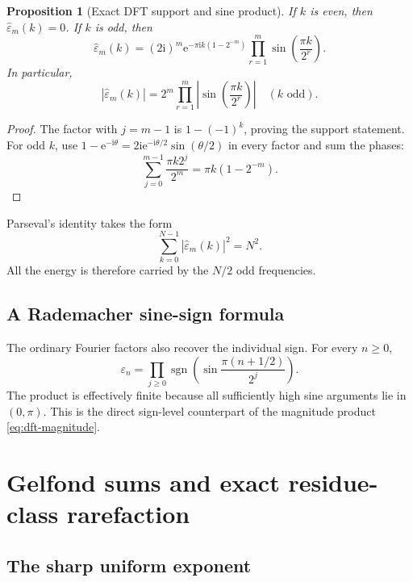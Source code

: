 \documentclass[11pt,oneside]{article}
\newtheorem{proposition}[theorem]{Proposition}
\theoremstyle{definition}
\theoremstyle{remark}
\newcommand{\e}{\mathrm e}
\newcommand{\ii}{\mathrm i}
\newcommand{\sgn}{\operatorname{sgn}}
\newcommand{\eps}{\varepsilon}
\begin{document}
\begin{proposition}[Exact DFT support and sine product]\label{prop:dft-sine}
If $k$ is even, then $\widehat\eps_m(k)=0$.  If $k$ is odd, then
\begin{equation}\label{eq:dft-sine}
 \widehat\eps_m(k)
 =(2\ii)^m\e^{-\pi\ii k(1-2^{-m})}
 \prod_{r=1}^{m}\sin\!\left(\frac{\pi k}{2^r}\right).
\end{equation}
In particular,
\begin{equation}\label{eq:dft-magnitude}
 |\widehat\eps_m(k)|
 =2^m\prod_{r=1}^{m}
   \left|\sin\!\left(\frac{\pi k}{2^r}\right)\right|
 \quad(k\text{ odd}).
\end{equation}
\end{proposition}

\begin{proof}
The factor with $j=m-1$ is $1-(-1)^k$, proving the support statement.  For
odd $k$, use
$1-\e^{-\ii\theta}=2\ii\e^{-\ii\theta/2}\sin(\theta/2)$ in every factor and
sum the phases:
\[
 \sum_{j=0}^{m-1}\frac{\pi k2^j}{2^m}
 =\pi k(1-2^{-m}).
\]
\end{proof}

Parseval's identity takes the form
\begin{equation}\label{eq:dft-parseval}
 \sum_{k=0}^{N-1}|\widehat\eps_m(k)|^2=N^2.
\end{equation}
All the energy is therefore carried by the $N/2$ odd frequencies.

\subsection{A Rademacher sine-sign formula}

The ordinary Fourier factors also recover the individual sign.  For every
$n\ge0$,
\begin{equation}\label{eq:rademacher-sign}
 \eps_n=\prod_{j\ge0}
 \sgn\!\left(\sin\frac{\pi(n+1/2)}{2^j}\right).
\end{equation}
The product is effectively finite because all sufficiently high sine arguments
lie in $(0,\pi)$.  This is the direct sign-level counterpart of the magnitude
product \cref{eq:dft-magnitude}.

\section{Gelfond sums and exact residue-class rarefaction}\label{sec:gelfond}

\subsection{The sharp uniform exponent}
\end{document}
